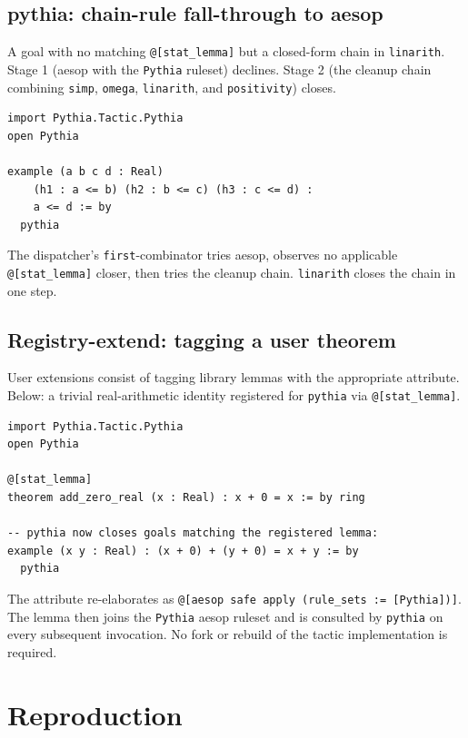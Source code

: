 \subsection{pythia: chain-rule fall-through to aesop}
\label{sec:appendix-worked-pythia-fall}

A goal with no matching \texttt{@[stat\_lemma]} but a closed-form
chain in \texttt{linarith}. Stage 1 (aesop with the \texttt{Pythia}
ruleset) declines. Stage 2 (the cleanup chain combining
\texttt{simp}, \texttt{omega}, \texttt{linarith}, and
\texttt{positivity}) closes.

\begin{lstlisting}
import Pythia.Tactic.Pythia
open Pythia

example (a b c d : Real)
    (h1 : a <= b) (h2 : b <= c) (h3 : c <= d) :
    a <= d := by
  pythia
\end{lstlisting}

The dispatcher's \texttt{first}-combinator tries aesop, observes no
applicable \texttt{@[stat\_lemma]} closer, then tries the cleanup
chain. \texttt{linarith} closes the chain in one step.

\subsection{Registry-extend: tagging a user theorem}
\label{sec:appendix-worked-extend}

User extensions consist of tagging library lemmas with the
appropriate attribute. Below: a trivial real-arithmetic identity
registered for \texttt{pythia} via \texttt{@[stat\_lemma]}.

\begin{lstlisting}
import Pythia.Tactic.Pythia
open Pythia

@[stat_lemma]
theorem add_zero_real (x : Real) : x + 0 = x := by ring

-- pythia now closes goals matching the registered lemma:
example (x y : Real) : (x + 0) + (y + 0) = x + y := by
  pythia
\end{lstlisting}

The attribute re-elaborates as
\texttt{@[aesop safe apply (rule\_sets := [Pythia])]}. The lemma
then joins the \texttt{Pythia} aesop ruleset and is consulted by
\texttt{pythia} on every subsequent invocation. No fork or rebuild
of the tactic implementation is required.

\section{Reproduction}
\label{sec:appendix-repro}

